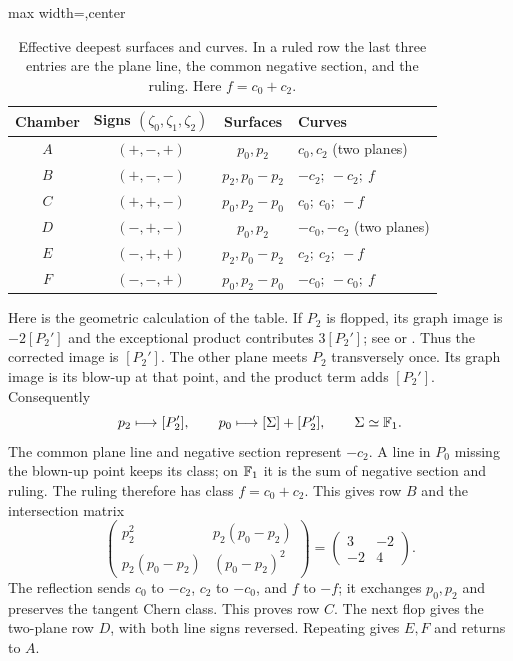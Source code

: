 \begin{table}[htbp]
\caption{Effective deepest surfaces and curves. In a ruled row the
last three entries are the plane line, the common negative section,
and the ruling. Here $f=c_0+c_2$.}
\label{tab:cycles}
\centering
\begin{adjustbox}{max width=\textwidth,center}
\begin{tabular}{cccl}
\toprule
Chamber & Signs $(\zeta_0,\zeta_1,\zeta_2)$ & Surfaces & Curves\\
\midrule
$A$ & $(+,-,+)$ & $p_0,p_2$ & $c_0,c_2$ (two planes)\\
$B$ & $(+,-,-)$ & $p_2,p_0-p_2$ & $-c_2;\ -c_2;\ f$\\
$C$ & $(+,+,-)$ & $p_0,p_2-p_0$ & $c_0;\ c_0;\ -f$\\
$D$ & $(-,+,-)$ & $p_0,p_2$ & $-c_0,-c_2$ (two planes)\\
$E$ & $(-,+,+)$ & $p_2,p_0-p_2$ & $c_2;\ c_2;\ -f$\\
$F$ & $(-,-,+)$ & $p_0,p_2-p_0$ & $-c_0;\ -c_0;\ f$\\
\bottomrule
\end{tabular}
\end{adjustbox}
\end{table}

Here is the geometric calculation of the table. If $P_2$ is
flopped, its graph image is $-2[P_2']$ and the exceptional
product contributes $3[P_2']$; see
\cite[Example~6.6]{llw} or \cite[\S6]{riess}. Thus the
corrected image is $[P_2']$. The other plane meets $P_2$
transversely once. Its graph image is its blow-up at that
point, and the product term adds $[P_2']$. Consequently
\begin{equation}\label{eq:surface-transform}
 p_2\longmapsto[P_2'],\qquad
 p_0\longmapsto[\Sigma]+[P_2'],\qquad \Sigma\simeq\mathbb F_1.
\end{equation}
The common plane line and negative section represent $-c_2$.
A line in $P_0$ missing the blown-up point keeps its class;
on $\mathbb F_1$ it is the sum of negative section and ruling.
The ruling therefore has class $f=c_0+c_2$. This gives row
$B$ and the intersection matrix
\begin{equation}\label{eq:ruled-matrix}
 \begin{pmatrix}p_2^2&p_2(p_0-p_2)\\
 p_2(p_0-p_2)&(p_0-p_2)^2\end{pmatrix}
 =\begin{pmatrix}3&-2\\-2&4\end{pmatrix}.
\end{equation}
The reflection sends $c_0$ to $-c_2$, $c_2$ to $-c_0$,
and $f$ to $-f$; it exchanges $p_0,p_2$ and preserves the
tangent Chern class. This proves row $C$. The next flop
gives the two-plane row $D$, with both line signs reversed.
Repeating gives $E,F$ and returns to $A$.

